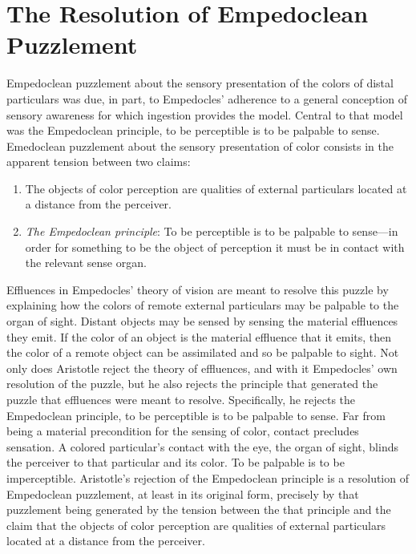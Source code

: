 

\section{The Resolution of Empedoclean Puzzlement} %
\label{sec:the_resolution_of_empedoclean_puzzlement}

Empedoclean puzzlement about the sensory presentation of the colors of distal particulars was due, in part, to Empedocles' adherence to a general conception of sensory awareness for which ingestion provides the model. Central to that model was the Empedoclean principle, to be perceptible is to be palpable to sense. Emedoclean puzzlement about the sensory presentation of color consists in the apparent tension between two claims:
\begin{enumerate}[(1)]
    \item The objects of color perception are qualities of external particulars located at a distance from the perceiver.
    \item \emph{The Empedoclean principle}: To be perceptible is to be palpable to sense---in order for something to be the object of perception it must be in contact with the relevant sense organ.
\end{enumerate}
Effluences in Empedocles' theory of vision are meant to resolve this puzzle by explaining how the colors of remote external particulars may be palpable to the organ of sight. Distant objects may be sensed by sensing the material effluences they emit. If the color of an object is the material effluence that it emits, then the color of a remote object can be assimilated and so be palpable to sight. Not only does Aristotle reject the theory of effluences, and with it Empedocles' own resolution of the puzzle, but he also rejects the principle that generated the puzzle that effluences were meant to resolve. Specifically, he rejects the Empedoclean principle, to be perceptible is to be palpable to sense. Far from being a material precondition for the sensing of color, contact precludes sensation. A colored particular's contact with the eye, the organ of sight, blinds the perceiver to that particular and its color. To be palpable is to be imperceptible. Aristotle's rejection of the Empedoclean principle is a resolution of Empedoclean puzzlement, at least in its original form, precisely by that puzzlement being generated by the tension between the that principle and the claim that the objects of color perception are qualities of external particulars located at a distance from the perceiver.

